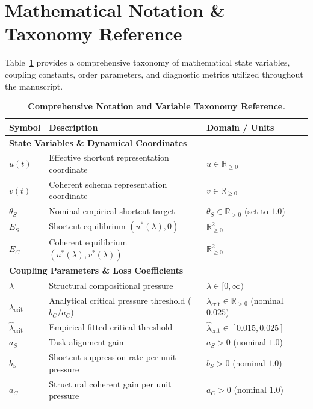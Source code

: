 \documentclass{article}
\theoremstyle{plain}
\theoremstyle{definition}
\begin{document}
\newpage
\appendix

\section{Mathematical Notation \& Taxonomy Reference}
\label{sec:appendix_notation}

Table~\ref{tab:notation_taxonomy} provides a comprehensive taxonomy of mathematical state variables, coupling constants, order parameters, and diagnostic metrics utilized throughout the manuscript.

\begin{table}[h]
\centering
\caption{\textbf{Comprehensive Notation and Variable Taxonomy Reference.}}
\label{tab:notation_taxonomy}
\vskip 0.1in
\begin{small}
\begin{tabular}{lll}
\toprule
Symbol & Description & Domain / Units \\
\midrule
\multicolumn{3}{l}{\textbf{State Variables \& Dynamical Coordinates}} \\
$u(t)$ & Effective shortcut representation coordinate & $u \in \mathbb{R}_{\ge 0}$ \\
$v(t)$ & Coherent schema representation coordinate & $v \in \mathbb{R}_{\ge 0}$ \\
$\theta_S$ & Nominal empirical shortcut target & $\theta_S \in \mathbb{R}_{> 0}$ (set to $1.0$) \\
$E_S$ & Shortcut equilibrium $(u^*(\lambda), 0)$ & $\mathbb{R}_{\ge 0}^2$ \\
$E_C$ & Coherent equilibrium $(u^*(\lambda), v^*(\lambda))$ & $\mathbb{R}_{\ge 0}^2$ \\
\midrule
\multicolumn{3}{l}{\textbf{Coupling Parameters \& Loss Coefficients}} \\
$\lambda$ & Structural compositional pressure & $\lambda \in [0, \infty)$ \\
$\lambda_{\text{crit}}$ & Analytical critical pressure threshold ($b_C / a_C$) & $\lambda_{\text{crit}} \in \mathbb{R}_{> 0}$ (nominal $0.025$) \\
$\hat{\lambda}_{\text{crit}}$ & Empirical fitted critical threshold & $\hat{\lambda}_{\text{crit}} \in [0.015, 0.025]$ \\
$a_S$ & Task alignment gain & $a_S > 0$ (nominal $1.0$) \\
$b_S$ & Shortcut suppression rate per unit pressure & $b_S > 0$ (nominal $1.0$) \\
$a_C$ & Structural coherent gain per unit pressure & $a_C > 0$ (nominal $1.0$) \\

\end{tabular}
\end{small}
\end{table}
\end{document}
